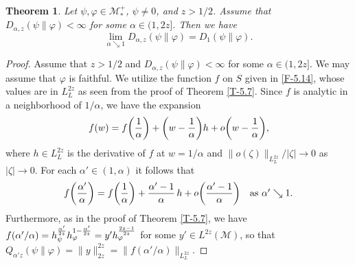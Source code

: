 \documentclass[12pt]{article}
\newtheorem{theorem}{Theorem}[section]
\theoremstyle{definition}
\theoremstyle{remark}
\numberwithin{equation}{section}
\def\Me{\mathcal M}
\def\ffi{\varphi}
\begin{document}
\begin{theorem}\label{T-6.9}
Let $\psi,\ffi\in\Me_*^+$, $\psi\ne0$, and $z>1/2$. Assume that $D_{\alpha,z}(\psi\|\ffi)<\infty$ for some
$\alpha\in(1,2z]$. Then we have
\[
\lim_{\alpha\searrow1}D_{\alpha,z}(\psi\|\ffi)=D_1(\psi\|\ffi).
\]
\end{theorem}

\begin{proof}
Assume that $z>1/2$ and $D_{\alpha,z}(\psi\|\ffi)<\infty$ for some $\alpha\in(1,2z]$. We may assume that
$\ffi$ is faithful. We utilize the function $f$ on $S$ given in \eqref{F-5.14}, whose values are in $L^{2z}_L$
as seen from the proof of Theorem \ref{T-5.7}. Since $f$ is analytic in a neighborhood of $1/\alpha$, we have
the expansion
\[
f(w)=f\biggl({1\over\alpha}\biggr)+\biggl(w-{1\over\alpha}\biggr)h+o\biggl(w-{1\over\alpha}\biggr),
\]
where $h\in L^{2z}_L$ is the derivative of $f$ at $w=1/\alpha$ and $\|o(\zeta)\|_{L^{2z}_L}/|\zeta|\to0$ as
$|\zeta|\to0$. For each $\alpha'\in(1,\alpha)$ it follows that
\[
f\biggl({\alpha'\over\alpha}\biggr)=f\biggl({1\over\alpha}\biggr)+{\alpha'-1\over\alpha}\,h
+o\biggl({\alpha'-1\over\alpha}\biggr)\quad\mbox{as $\alpha'\searrow1$}.
\]
Furthermore, as in the proof of Theorem \ref{T-5.7}, we have
$f(\alpha'/\alpha)=h_\psi^{\alpha'\over2z}h_\ffi^{1-{\alpha'\over2z}}=y'h_\ffi^{2z-1\over2z}$ for some
$y'\in L^{2z}(\Me)$, so that $Q_{\alpha'z}(\psi\|\ffi)=\|y\|_{2z}^{2z}=\|f(\alpha'/\alpha)\|_{L^{2z}_L}$.


\end{proof}
\end{document}
